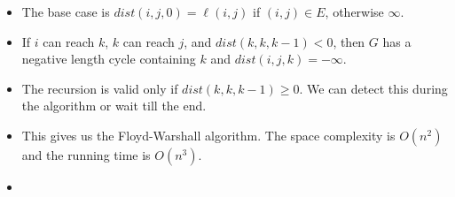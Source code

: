 \documentclass[12pt]{article}
\begin{document}
\begin{itemize}
\begin{center}
    \end{center}
    \item The base case is $dist(i, j, 0) = \ell(i, j)$ if $(i, j) \in E$, otherwise $\infty$.
    \item If $i$ can reach $k$, $k$ can reach $j$, and $dist(k, k, k - 1) < 0$, then $G$ has a negative length cycle containing $k$ and $dist(i, j, k) = -\infty$.
    \item The recursion is valid only if $dist(k, k, k - 1) \geq 0$. We can detect this during the algorithm or wait till the end.
    \item This gives us the Floyd-Warshall algorithm. The space complexity is $O(n^2)$ and the running time is $O(n^3)$.
    \item[] 
\end{itemize}
\end{document}
